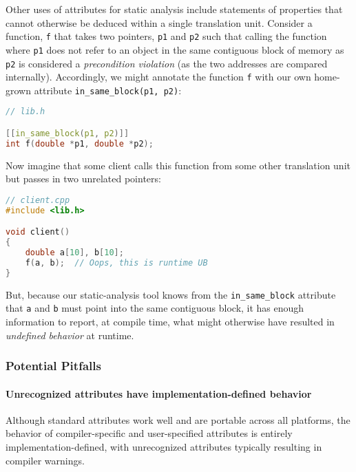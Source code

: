 \documentclass[twoside,10pt,letterpaper,usenames]{newstyle-PearsonGeneric-7-38}
\begin{document}
Other uses of attributes for static analysis include statements of
properties that cannot otherwise be deduced within a single translation
unit. Consider a function, \texttt{f} that takes two pointers,
\texttt{p1} and \texttt{p2} such that calling the function where
\texttt{p1} does not refer to an object in the same contiguous block of
memory as \texttt{p2} is considered a \emph{precondition violation} (as
the two addresses are compared internally). Accordingly, we might
annotate the function \texttt{f} with our own home-grown attribute
\texttt{in\_same\_block(p1, p2)}:

\begin{lstlisting}[language=C++]
// lib.h

[[in_same_block(p1, p2)]]
int f(double *p1, double *p2);
\end{lstlisting}
    

Now imagine that some client calls this function from some other
translation unit but passes in two unrelated pointers:

\begin{lstlisting}[language=C++]
// client.cpp
#include <lib.h>

void client()
{
    double a[10], b[10];
    f(a, b);  // Oops, this is runtime UB
}
\end{lstlisting}
    

But, because our static-analysis tool knows from the
\texttt{in\_same\_block} attribute that \texttt{a} and \texttt{b} must
point into the same contiguous block, it has enough information to
report, at compile time, what might otherwise have resulted in
\emph{undefined behavior} at runtime.

\subsubsection[Potential Pitfalls]{Potential Pitfalls}\label{potential-pitfalls}

\paragraph[Unrecognized attributes have implementation-defined behavior]{Unrecognized attributes have implementation-defined behavior}\label{unrecognized-attributes-have-implementation-defined-behavior}

Although standard attributes work well and are portable across all
platforms, the behavior of compiler-specific and user-specified
attributes is entirely implementation-defined, with unrecognized
attributes typically resulting in compiler warnings.
\end{document}
